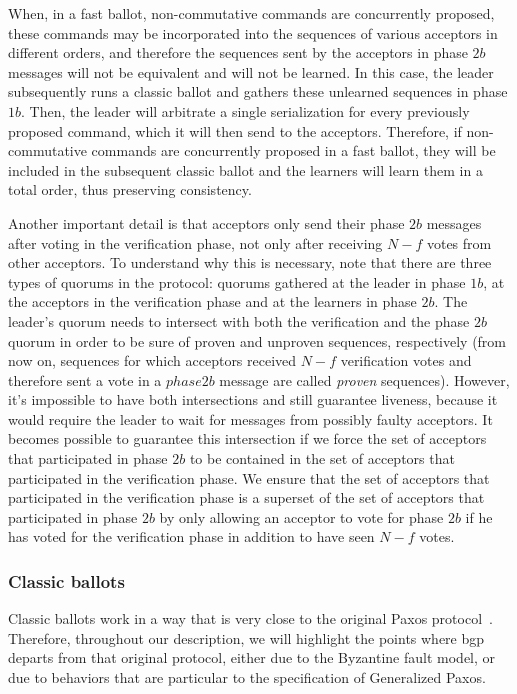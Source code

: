  When, in a fast ballot, non-commutative commands are  concurrently proposed, these commands may be incorporated into the sequences of various acceptors in different orders, and therefore the sequences sent by the acceptors in phase $2b$ messages will not be equivalent and will not be learned. In this case, the leader subsequently runs a classic ballot and gathers these unlearned sequences in phase $1b$. Then, the leader will arbitrate a single serialization for every previously proposed command, which it will then send to the acceptors. Therefore, if non-commutative commands are concurrently proposed in a fast ballot, they will be included in the subsequent classic ballot and the learners will learn them in a total order, thus preserving consistency.\par
{} 
Another important detail is that acceptors only send their phase $2b$ messages after voting in the verification phase, not only after receiving $N-f$ votes from other acceptors. To understand why this is necessary, note that there are three types of quorums in the protocol: quorums gathered at the leader in phase $1b$, at the acceptors in the verification phase and at the learners in phase $2b$. The leader's quorum needs to intersect with both the verification and the phase $2b$ quorum in order to be sure of proven and unproven sequences, respectively (from now on, sequences for which acceptors received $N-f$ verification votes and therefore sent a vote in a $phase 2b$ message are called \textit{proven} sequences). However, it's impossible to have both intersections and still guarantee liveness, because it would require the leader to wait for messages from possibly faulty acceptors. It becomes possible to guarantee this intersection if we force the set of acceptors that participated in phase $2b$ to be contained in the set of acceptors that participated in the verification phase. We ensure that the set of acceptors that participated in the verification phase is a superset of the set of acceptors that participated in phase $2b$ by only allowing an acceptor to vote for phase $2b$ if he has voted for the verification phase in addition to have seen $N-f$ votes.

\subsubsection{Classic ballots} 

Classic ballots work in a way that is very close to the original Paxos protocol~\cite{Lam98}. Therefore, throughout our description, we will highlight the points where \acrshort{bgp} departs from that original protocol, either due to the Byzantine fault model, or due to behaviors that are particular to the specification of Generalized Paxos.

